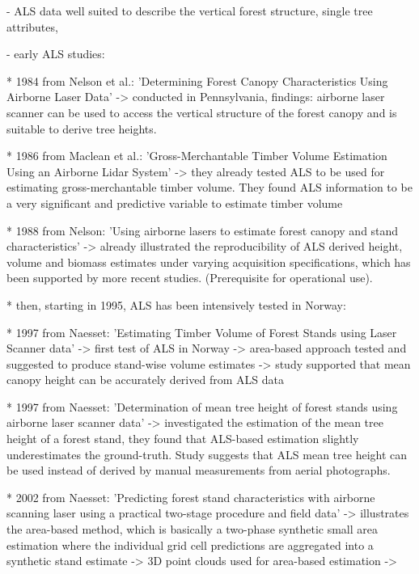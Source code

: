  - ALS data well suited to describe the vertical forest structure, single tree attributes, 

	- early ALS studies:
	
		*  1984 from Nelson et al.: 'Determining Forest Canopy Characteristics Using Airborne Laser Data'
		  -> conducted in Pennsylvania, findings: airborne laser scanner can be used to access the vertical structure of the forest canopy and is suitable to derive tree heights.
		  
		* 1986 from Maclean et al.: 'Gross-Merchantable Timber Volume Estimation Using an Airborne Lidar System'
		  -> they already tested ALS to be used for estimating gross-merchantable timber volume. They found ALS information to be a very significant and predictive variable to estimate timber volume
		     
		* 1988 from Nelson: 'Using airborne lasers to estimate forest canopy and stand characteristics'
		  -> already illustrated the reproducibility of ALS derived height, volume and biomass estimates under varying acquisition specifications, which has been supported by more recent studies. (Prerequisite for operational use).
		     
		* then, starting in 1995, ALS has been intensively tested in Norway:    
		     
			* 1997 from Naesset: 'Estimating Timber Volume of Forest Stands using Laser Scanner data'
			  -> first test of ALS in Norway
			  -> area-based approach tested and suggested to produce stand-wise volume estimates
			  -> study supported that mean canopy height can be accurately derived from ALS data
			  
			* 1997 from Naesset: 'Determination of mean tree height of forest stands using airborne laser scanner data'
			 -> investigated the estimation of the mean tree height of a forest stand, they found that ALS-based estimation
			    slightly underestimates the ground-truth. Study suggests that ALS mean tree height can be used instead of
			    derived by manual measurements from aerial photographs.			
			
			* 2002 from Naesset: 'Predicting forest stand characteristics with airborne scanning laser using a practical two-stage procedure and ﬁeld data'
			  -> illustrates the area-based method, which is basically a two-phase synthetic small area estimation where the individual grid cell predictions
			     are aggregated into a synthetic stand estimate
			  -> 3D point clouds used for area-based estimation
			  -> 
			  
